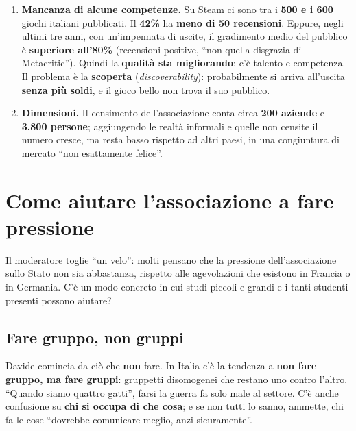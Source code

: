 \begin{enumerate}
        dell'associazione è rompere le scatole perché queste cose succedano.''
  \item \textbf{Mancanza di alcune competenze.} Su Steam ci sono tra i
        \textbf{500 e i 600} giochi italiani pubblicati. Il \textbf{42\%} ha
        \textbf{meno di 50 recensioni}. Eppure, negli ultimi tre anni, con
        un'impennata di uscite, il gradimento medio del pubblico è
        \textbf{superiore all'80\%} (recensioni positive, ``non quella disgrazia di
        Metacritic''). Quindi la \textbf{qualità sta migliorando}: c'è talento e
        competenza. Il problema è la \textbf{scoperta} (\emph{discoverability}):
        probabilmente si arriva all'uscita \textbf{senza più soldi}, e il gioco
        bello non trova il suo pubblico.
  \item \textbf{Dimensioni.} Il censimento dell'associazione conta circa
        \textbf{200 aziende} e \textbf{3.800 persone}; aggiungendo le realtà
        informali e quelle non censite il numero cresce, ma resta basso rispetto ad
        altri paesi, in una congiuntura di mercato ``non esattamente felice''.
\end{enumerate}

\section{Come aiutare l'associazione a fare pressione}
\label{sec:c2-3-pressione}

Il moderatore toglie ``un velo'': molti pensano che la pressione
dell'associazione sullo Stato non sia abbastanza, rispetto alle agevolazioni che
esistono in Francia o in Germania. C'è un modo concreto in cui studi piccoli e
grandi e i tanti studenti presenti possono aiutare?

\subsection{Fare gruppo, non gruppi}

Davide comincia da ciò che \textbf{non} fare. In Italia c'è la tendenza a
\textbf{non fare gruppo, ma fare gruppi}: gruppetti disomogenei che restano uno
contro l'altro. ``Quando siamo quattro gatti'', farsi la guerra fa solo male al
settore. C'è anche confusione su \textbf{chi si occupa di che cosa}; e se non tutti
lo sanno, ammette, chi fa le cose ``dovrebbe comunicare meglio, anzi
sicuramente''.

